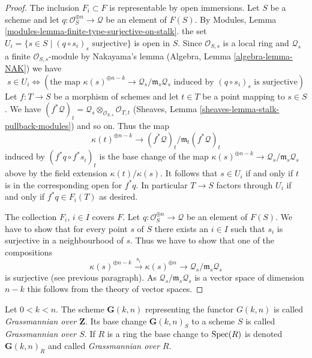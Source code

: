 \begin{proof}
\medskip\noindent
The inclusion $F_i \subset F$ is representable by open immersions.
Let $S$ be a scheme and let
$q : \mathcal{O}_S^{\oplus n} \to \mathcal{Q}$ be an element of
$F(S)$. By
Modules, Lemma \ref{modules-lemma-finite-type-surjective-on-stalk}.
the set $U_i = \{s \in S \mid (q \circ s_i)_s\text{ surjective}\}$
is open in $S$. Since $\mathcal{O}_{S, s}$ is a local ring
and $\mathcal{Q}_s$ a finite $\mathcal{O}_{S, s}$-module
by Nakayama's lemma (Algebra, Lemma \ref{algebra-lemma-NAK}) we have
$$
s \in U_i \Leftrightarrow
\left(
\text{the map }
\kappa(s)^{\oplus n - k} \to \mathcal{Q}_s/\mathfrak m_s\mathcal{Q}_s
\text{ induced by }
(q \circ s_i)_s
\text{ is surjective}
\right)
$$
Let $f : T \to S$ be a morphism of schemes and let $t \in T$ be a point
mapping to $s \in S$. We have
$(f^*\mathcal{Q})_t =
\mathcal{Q}_s \otimes_{\mathcal{O}_{S, s}} \mathcal{O}_{T, t}$
(Sheaves, Lemma \ref{sheaves-lemma-stalk-pullback-modules})
and so on. Thus the map
$$
\kappa(t)^{\oplus n - k} \to (f^*\mathcal{Q})_t/\mathfrak m_t(f^*\mathcal{Q})_t
$$
induced by $(f^*q \circ f^*s_i)_t$ is the base change of the map
$\kappa(s)^{\oplus n - k} \to \mathcal{Q}_s/\mathfrak m_s\mathcal{Q}_s$
above by the field extension $\kappa(t)/\kappa(s)$. It follows
that $s \in U_i$ if and only if $t$ is in the corresponding open
for $f^*q$. In particular $T \to S$ factors through $U_i$ if
and only if $f^*q \in F_i(T)$ as desired.

\medskip\noindent
The collection $F_i$, $i \in I$ covers $F$. Let
$q : \mathcal{O}_S^{\oplus n} \to \mathcal{Q}$ be an element of
$F(S)$. We have to show that for every point $s$ of $S$ there exists
an $i \in I$ such that $s_i$ is surjective in a neighbourhood of $s$.
Thus we have to show that one of the compositions
$$
\kappa(s)^{\oplus n - k} \xrightarrow{s_i}
\kappa(s)^{\oplus n} \rightarrow
\mathcal{Q}_s/\mathfrak m_s\mathcal{Q}_s
$$
is surjective (see previous paragraph). As
$\mathcal{Q}_s/\mathfrak m_s\mathcal{Q}_s$ is a vector space of
dimension $n - k$ this follows from the theory of vector spaces.
\end{proof}

\begin{definition}
\label{definition-grassmannian}
Let $0 < k < n$. The scheme $\mathbf{G}(k, n)$ representing the functor
$G(k, n)$ is called {\it Grassmannian over $\mathbf{Z}$}.
Its base change $\mathbf{G}(k, n)_S$ to a scheme $S$ is called
{\it Grassmannian over $S$}. If $R$ is a ring the base change
to $\mathop{\mathrm{Spec}}(R)$ is denoted $\mathbf{G}(k, n)_R$ and called
{\it Grassmannian over $R$}.
\end{definition}

